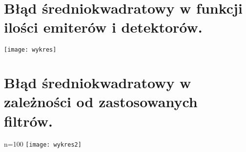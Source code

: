 \documentclass{article}
\begin{document}
\section{Błąd średniokwadratowy w funkcji ilości emiterów i detektorów.}
\texttt{[image: wykres]}
\centering

\section{Błąd średniokwadratowy w zależności od zastosowanych filtrów.}
n=100
\texttt{[image: wykres2]}
\centering
 
\end{document}
